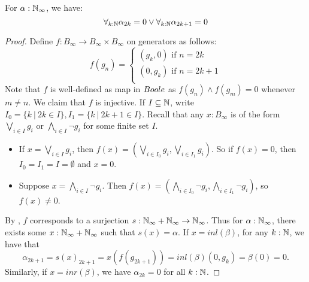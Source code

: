 \begin{theorem}\label{LLPO}
  For $\alpha:\mathbb{N}_\infty$, 
  we have: 
  \[\label{eqnLLPO}
    \forall_{k:\mathbb{N}} \alpha_{2k} = 0  \vee \forall_{k:\mathbb{N}} \alpha_{2k+1} = 0
  \]
\end{theorem}
\begin{proof}
%
  Define $f:B_\infty \to B_\infty \times B_\infty$ on generators as follows:
  \[\label{eqnLLPOProofMap}
    f(g_n) =\begin{cases}
      (g_k,0) \text{ if } n = 2k\\
      (0,g_k) \text{ if } n = 2k+1\\
    \end{cases}
  \]
  Note that $f$ is well-defined as map in $\Boole$ as 
  $f(g_n) \wedge f(g_m) = 0$ whenever $m\neq n$. 
  We claim that $f$ is injective. 
  If $I\subseteq \mathbb{N}$, write 
  $ I_0 =\{k\ |\ 2k \in I\}, 
    I_1 =\{k\ |\ 2k+1 \in I\}
  $.
  Recall that any $x:B_\infty$ is of the form 
  $\bigvee_{i\in I} g_i$ or $\bigwedge_{i\in I} \neg g_i$ for some finite set $I$. 
  \begin{itemize}
    \item If $x = \bigvee_{i\in I} g_i$, then 
      $f(x) = (\bigvee_{i\in I_0}g_{i}, \bigvee_{i\in I_1}g_i)$. 
      So if $f(x) = 0$, then $I_0=I_1 = I = \emptyset$ and $x = 0$. 
    \item Suppose 
      $x = \bigwedge_{i\in I} \neg g_i$.
      Then $f(x) = (\bigwedge_{i\in I_0} \neg g_i, \bigwedge_{i\in I_1} \neg g_i)$, 
      so $f(x) \neq 0$. 
  \end{itemize}
  By ,
  $f$ corresponds to a surjection 
  $s:\mathbb{N}_{\infty} + \mathbb{N}_{\infty} \to \mathbb{N}_{\infty}$.
  Thus for $\alpha : \mathbb{N}_{\infty}$, 
  there exists some $x:\mathbb{N}_{\infty} + \mathbb{N}_{\infty}$ such that $s(x) = \alpha$. 
  If $x = inl(\beta)$, 
  for any $k:\mathbb{N}$, we have that 
\[\alpha_{2k+1} = s(x)_{2k+1} = x(f(g_{2k+1})) = inl(\beta) (0,g_k)  = \beta(0) = 0.\]
  Similarly, if $x = inr(\beta)$, we have $\alpha_{2k} = 0$ for all $k:\mathbb{N}$. 
\end{proof}
